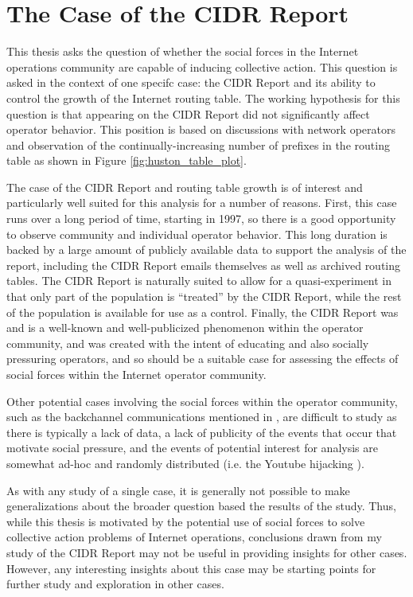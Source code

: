 \section{The Case of the CIDR Report}

This thesis asks the question of whether the social forces in the Internet operations community are capable of inducing collective action. This question is asked in the context of one specifc case: the CIDR Report and its ability to control the growth of the Internet routing table. The working hypothesis for this question is that appearing on the CIDR Report did not significantly affect operator behavior. This position is based on discussions with network operators and observation of the continually-increasing number of prefixes in the routing table as shown in Figure \ref{fig:huston_table_plot}.

The case of the CIDR Report and routing table growth is of interest and particularly well suited for this analysis for a number of reasons. First, this case runs over a long period of time, starting in 1997, so there is a good opportunity to observe community and individual operator behavior. This long duration is backed by a large amount of publicly available data to support the analysis of the report, including the CIDR Report emails themselves as well as archived routing tables. The CIDR Report is naturally suited to allow for a quasi-experiment in that only part of the population is ``treated'' by the CIDR Report, while the rest of the population is available for use as a control. Finally, the CIDR Report was and is a well-known and well-publicized phenomenon within the operator community, and was created with the intent of educating and also socially pressuring operators, and so should be a suitable case for assessing the effects of social forces within the Internet operator community.

Other potential cases involving the social forces within the operator community, such as the backchannel communications mentioned in \cite{Mathew:2010ly}, are difficult to study as there is typically a lack of data, a lack of publicity of the events that occur that motivate social pressure, and the events of potential interest for analysis are somewhat ad-hoc and randomly distributed (i.e. the Youtube hijacking \cite{Brown:2008hc}).

As with any study of a single case, it is generally not possible to make generalizations about the broader question based the results of the study. Thus, while this thesis is motivated by the potential use of social forces to solve collective action problems of Internet operations, conclusions drawn from my study of the CIDR Report may not be useful in providing insights for other cases. However, any interesting insights about this case may be starting points for further study and exploration in other cases.

